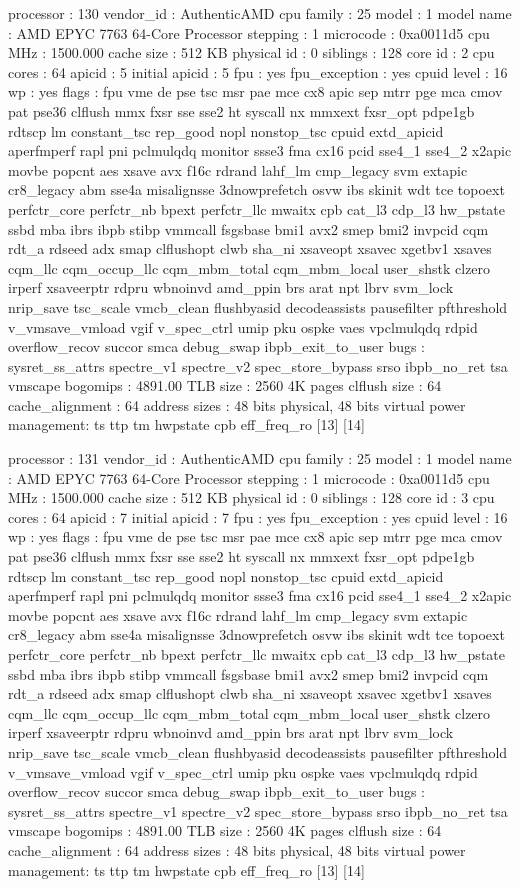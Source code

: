processor	: 130
vendor_id	: AuthenticAMD
cpu family	: 25
model		: 1
model name	: AMD EPYC 7763 64-Core Processor
stepping	: 1
microcode	: 0xa0011d5
cpu MHz		: 1500.000
cache size	: 512 KB
physical id	: 0
siblings	: 128
core id		: 2
cpu cores	: 64
apicid		: 5
initial apicid	: 5
fpu		: yes
fpu_exception	: yes
cpuid level	: 16
wp		: yes
flags		: fpu vme de pse tsc msr pae mce cx8 apic sep mtrr pge mca cmov pat pse36 clflush mmx fxsr sse sse2 ht syscall nx mmxext fxsr_opt pdpe1gb rdtscp lm constant_tsc rep_good nopl nonstop_tsc cpuid extd_apicid aperfmperf rapl pni pclmulqdq monitor ssse3 fma cx16 pcid sse4_1 sse4_2 x2apic movbe popcnt aes xsave avx f16c rdrand lahf_lm cmp_legacy svm extapic cr8_legacy abm sse4a misalignsse 3dnowprefetch osvw ibs skinit wdt tce topoext perfctr_core perfctr_nb bpext perfctr_llc mwaitx cpb cat_l3 cdp_l3 hw_pstate ssbd mba ibrs ibpb stibp vmmcall fsgsbase bmi1 avx2 smep bmi2 invpcid cqm rdt_a rdseed adx smap clflushopt clwb sha_ni xsaveopt xsavec xgetbv1 xsaves cqm_llc cqm_occup_llc cqm_mbm_total cqm_mbm_local user_shstk clzero irperf xsaveerptr rdpru wbnoinvd amd_ppin brs arat npt lbrv svm_lock nrip_save tsc_scale vmcb_clean flushbyasid decodeassists pausefilter pfthreshold v_vmsave_vmload vgif v_spec_ctrl umip pku ospke vaes vpclmulqdq rdpid overflow_recov succor smca debug_swap ibpb_exit_to_user
bugs		: sysret_ss_attrs spectre_v1 spectre_v2 spec_store_bypass srso ibpb_no_ret tsa vmscape
bogomips	: 4891.00
TLB size	: 2560 4K pages
clflush size	: 64
cache_alignment	: 64
address sizes	: 48 bits physical, 48 bits virtual
power management: ts ttp tm hwpstate cpb eff_freq_ro [13] [14]

processor	: 131
vendor_id	: AuthenticAMD
cpu family	: 25
model		: 1
model name	: AMD EPYC 7763 64-Core Processor
stepping	: 1
microcode	: 0xa0011d5
cpu MHz		: 1500.000
cache size	: 512 KB
physical id	: 0
siblings	: 128
core id		: 3
cpu cores	: 64
apicid		: 7
initial apicid	: 7
fpu		: yes
fpu_exception	: yes
cpuid level	: 16
wp		: yes
flags		: fpu vme de pse tsc msr pae mce cx8 apic sep mtrr pge mca cmov pat pse36 clflush mmx fxsr sse sse2 ht syscall nx mmxext fxsr_opt pdpe1gb rdtscp lm constant_tsc rep_good nopl nonstop_tsc cpuid extd_apicid aperfmperf rapl pni pclmulqdq monitor ssse3 fma cx16 pcid sse4_1 sse4_2 x2apic movbe popcnt aes xsave avx f16c rdrand lahf_lm cmp_legacy svm extapic cr8_legacy abm sse4a misalignsse 3dnowprefetch osvw ibs skinit wdt tce topoext perfctr_core perfctr_nb bpext perfctr_llc mwaitx cpb cat_l3 cdp_l3 hw_pstate ssbd mba ibrs ibpb stibp vmmcall fsgsbase bmi1 avx2 smep bmi2 invpcid cqm rdt_a rdseed adx smap clflushopt clwb sha_ni xsaveopt xsavec xgetbv1 xsaves cqm_llc cqm_occup_llc cqm_mbm_total cqm_mbm_local user_shstk clzero irperf xsaveerptr rdpru wbnoinvd amd_ppin brs arat npt lbrv svm_lock nrip_save tsc_scale vmcb_clean flushbyasid decodeassists pausefilter pfthreshold v_vmsave_vmload vgif v_spec_ctrl umip pku ospke vaes vpclmulqdq rdpid overflow_recov succor smca debug_swap ibpb_exit_to_user
bugs		: sysret_ss_attrs spectre_v1 spectre_v2 spec_store_bypass srso ibpb_no_ret tsa vmscape
bogomips	: 4891.00
TLB size	: 2560 4K pages
clflush size	: 64
cache_alignment	: 64
address sizes	: 48 bits physical, 48 bits virtual
power management: ts ttp tm hwpstate cpb eff_freq_ro [13] [14]

